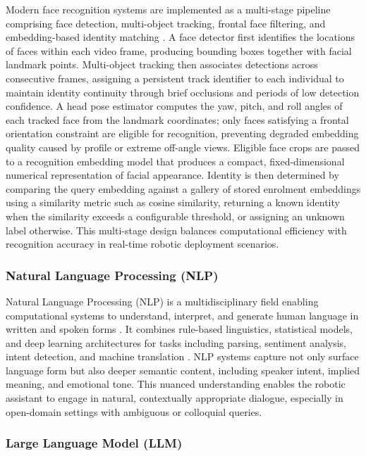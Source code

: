 Modern face recognition systems are implemented as a multi-stage pipeline comprising face detection, multi-object tracking, frontal face filtering, and embedding-based identity matching \cite{unogeeks}. A face detector first identifies the locations of faces within each video frame, producing bounding boxes together with facial landmark points. Multi-object tracking then associates detections across consecutive frames, assigning a persistent track identifier to each individual to maintain identity continuity through brief occlusions and periods of low detection confidence. A head pose estimator computes the yaw, pitch, and roll angles of each tracked face from the landmark coordinates; only faces satisfying a frontal orientation constraint are eligible for recognition, preventing degraded embedding quality caused by profile or extreme off-angle views. Eligible face crops are passed to a recognition embedding model that produces a compact, fixed-dimensional numerical representation of facial appearance. Identity is then determined by comparing the query embedding against a gallery of stored enrolment embeddings using a similarity metric such as cosine similarity, returning a known identity when the similarity exceeds a configurable threshold, or assigning an unknown label otherwise. This multi-stage design balances computational efficiency with recognition accuracy in real-time robotic deployment scenarios.

\subsubsection{Natural Language Processing (NLP)}

Natural Language Processing (NLP) is a multidisciplinary field enabling computational systems to understand, interpret, and generate human language in written and spoken forms \cite{geeksforgeeks2024}. It combines rule-based linguistics, statistical models, and deep learning architectures for tasks including parsing, sentiment analysis, intent detection, and machine translation \cite{gillis2024}. NLP systems capture not only surface language form but also deeper semantic content, including speaker intent, implied meaning, and emotional tone. This nuanced understanding enables the robotic assistant to engage in natural, contextually appropriate dialogue, especially in open-domain settings with ambiguous or colloquial queries.

\subsubsection{Large Language Model (LLM)}

